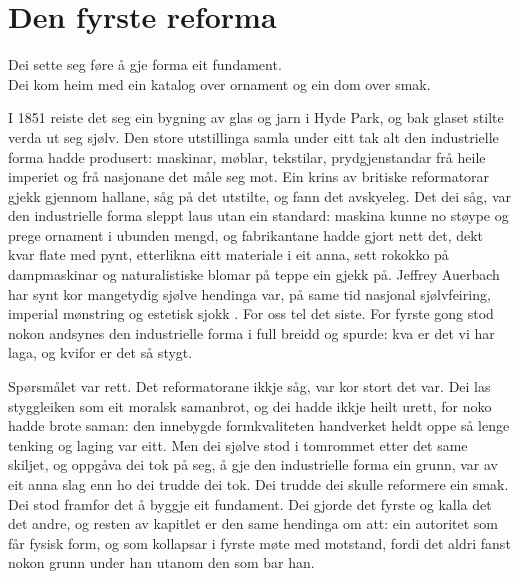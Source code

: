 \chapter{Den fyrste reforma}

\begin{motto}
Dei sette seg føre å gje forma eit fundament.\\ Dei kom heim med ein katalog over ornament og ein dom over smak.
\end{motto}

I 1851 reiste det seg ein bygning av glas og jarn i Hyde Park, og bak glaset stilte verda ut seg sjølv. Den store utstillinga samla under eitt tak alt den industrielle forma hadde produsert: maskinar, møblar, tekstilar, prydgjenstandar frå heile imperiet og frå nasjonane det måle seg mot. Ein krins av britiske reformatorar gjekk gjennom hallane, såg på det utstilte, og fann det avskyeleg. Det dei såg, var den industrielle forma sleppt laus utan ein standard: maskina kunne no støype og prege ornament i ubunden mengd, og fabrikantane hadde gjort nett det, dekt kvar flate med pynt, etterlikna eitt materiale i eit anna, sett rokokko på dampmaskinar og naturalistiske blomar på teppe ein gjekk på. Jeffrey Auerbach har synt kor mangetydig sjølve hendinga var, på same tid nasjonal sjølvfeiring, imperial mønstring og estetisk sjokk \autocite{auerbach1999}. For oss tel det siste. For fyrste gong stod nokon andsynes den industrielle forma i full breidd og spurde: kva er det vi har laga, og kvifor er det så stygt.

Spørsmålet var rett. Det reformatorane ikkje såg, var kor stort det var. Dei las styggleiken som eit moralsk samanbrot, og dei hadde ikkje heilt urett, for noko hadde brote saman: den innebygde formkvaliteten handverket heldt oppe så lenge tenking og laging var eitt. Men dei sjølve stod i tomrommet etter det same skiljet, og oppgåva dei tok på seg, å gje den industrielle forma ein grunn, var av eit anna slag enn ho dei trudde dei tok. Dei trudde dei skulle reformere ein smak. Dei stod framfor det å byggje eit fundament. Dei gjorde det fyrste og kalla det det andre, og resten av kapitlet er den same hendinga om att: ein autoritet som får fysisk form, og som kollapsar i fyrste møte med motstand, fordi det aldri fanst nokon grunn under han utanom den som bar han.


